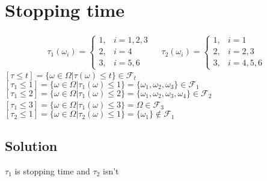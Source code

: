 \documentclass[12pt]{article}
\begin{document}
\section{Stopping time}
\begin{align*}
    \tau_1(\omega_i)=\begin{cases}
        1, & i = 1, 2, 3\\
        2, & i = 4\\
        3, & i = 5, 6
    \end{cases}\quad\ 
    \tau_2(\omega_i)=\begin{cases}
        1, & i = 1\\
        2, & i = 2, 3\\
        3, & i = 4, 5, 6
    \end{cases}
\end{align*}
$[\tau \leq t] = \{\omega \in \Omega|\tau(\omega)\leq t\}\in \mathcal{F}_t$\\
$[\tau_1\leq1] = \{\omega \in \Omega|\tau_1(\omega)\leq 1\} = \{\omega_1, \omega_2, \omega_3\}\in\mathcal{F}_1$\\
$[\tau_1\leq2] = \{\omega \in \Omega|\tau_1(\omega)\leq 2\} = \{\omega_1, \omega_2, \omega_3, \omega_4\}\in\mathcal{F}_2$\\
$[\tau_1\leq3] = \{\omega \in \Omega|\tau_1(\omega)\leq 3\} = \Omega \in\mathcal{F}_3$
\newline
\newline
\quad\ \quad\ $[\tau_2\leq1] = \{\omega \in \Omega|\tau_2(\omega)\leq 1\} = \{\omega_1\}\notin\mathcal{F}_1$\\
\subsection*{Solution}
$\tau_1$ is stopping time and $\tau_2$ isn't
\end{document}
